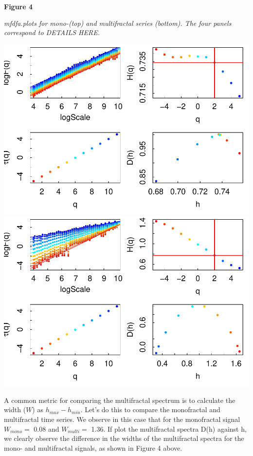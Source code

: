 \documentclass[
  man]{apa6}
\begin{document}
\textbf{Figure 4}

\emph{mfdfa.plots for mono-(top) and multifractal series (bottom). The four
panels correspond to DETAILS HERE.}

\includegraphics{fractal_regression_paper_brm_files/figure-latex/unnamed-chunk-9-1.pdf} \includegraphics{fractal_regression_paper_brm_files/figure-latex/unnamed-chunk-9-2.pdf}

A common metric for comparing the multifractal spectrum is to calculate
the width (\(W\)) as \(h_{max} - h_{min}\). Let's do this to compare the
monofractal and multifractal time series. We observe in this case that
for the monofractal signal \(W_{mono} =\)
0.08 and \(W_{multi} =\)
1.36. If plot the
multifractal spectra D(h) against h, we clearly observe the difference
in the widths of the multifractal spectra for the mono- and multifractal
signals, as shown in Figure 4 above.
\end{document}
